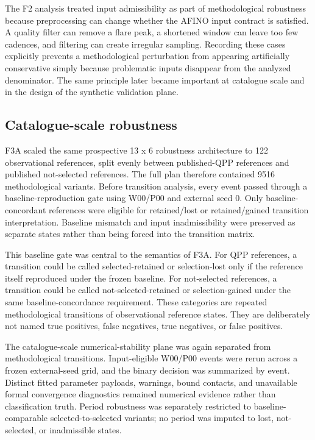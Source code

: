 \documentclass[11pt,a4paper]{article}
\begin{document}
The F2 analysis treated input admissibility as part of methodological robustness because preprocessing can change whether the AFINO input contract is satisfied. A quality filter can remove a flare peak, a shortened window can leave too few cadences, and filtering can create irregular sampling. Recording these cases explicitly prevents a methodological perturbation from appearing artificially conservative simply because problematic inputs disappear from the analyzed denominator. The same principle later became important at catalogue scale and in the design of the synthetic validation plane.

\subsection{Catalogue-scale robustness}
F3A scaled the same prospective 13 x 6 robustness architecture to 122 observational references, split evenly between published-QPP references and published not-selected references. The full plan therefore contained 9516 methodological variants. Before transition analysis, every event passed through a baseline-reproduction gate using W00/P00 and external seed 0. Only baseline-concordant references were eligible for retained/lost or retained/gained transition interpretation. Baseline mismatch and input inadmissibility were preserved as separate states rather than being forced into the transition matrix.

This baseline gate was central to the semantics of F3A. For QPP references, a transition could be called selected-retained or selection-lost only if the reference itself reproduced under the frozen baseline. For not-selected references, a transition could be called not-selected-retained or selection-gained under the same baseline-concordance requirement. These categories are repeated methodological transitions of observational reference states. They are deliberately not named true positives, false negatives, true negatives, or false positives.

The catalogue-scale numerical-stability plane was again separated from methodological transitions. Input-eligible W00/P00 events were rerun across a frozen external-seed grid, and the binary decision was summarized by event. Distinct fitted parameter payloads, warnings, bound contacts, and unavailable formal convergence diagnostics remained numerical evidence rather than classification truth. Period robustness was separately restricted to baseline-comparable selected-to-selected variants; no period was imputed to lost, not-selected, or inadmissible states.
\end{document}
